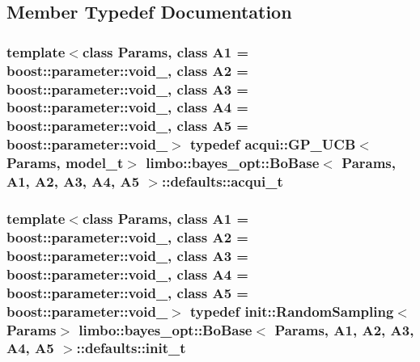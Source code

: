 \subsection{Member Typedef Documentation}
\hypertarget{structlimbo_1_1bayes__opt_1_1_bo_base_1_1defaults_a4ba658f2746db27c5f3abdb24d2a2f85}{}
\subsubsection[{acqui\+\_\+t}]{\setlength{\rightskip}{0pt plus 5cm}template$<$class Params, class A1 = boost\+::parameter\+::void\+\_\+, class A2 = boost\+::parameter\+::void\+\_\+, class A3 = boost\+::parameter\+::void\+\_\+, class A4 = boost\+::parameter\+::void\+\_\+, class A5 = boost\+::parameter\+::void\+\_\+$>$ typedef {\bf acqui\+::\+G\+P\+\_\+\+U\+C\+B}$<$Params, {\bf model\+\_\+t}$>$ {\bf limbo\+::bayes\+\_\+opt\+::\+Bo\+Base}$<$ Params, A1, A2, A3, A4, A5 $>$\+::{\bf defaults\+::acqui\+\_\+t}}\label{structlimbo_1_1bayes__opt_1_1_bo_base_1_1defaults_a4ba658f2746db27c5f3abdb24d2a2f85}
\hypertarget{structlimbo_1_1bayes__opt_1_1_bo_base_1_1defaults_acbba74470eccef31c3f2518a3c57200c}{}
\subsubsection[{init\+\_\+t}]{\setlength{\rightskip}{0pt plus 5cm}template$<$class Params, class A1 = boost\+::parameter\+::void\+\_\+, class A2 = boost\+::parameter\+::void\+\_\+, class A3 = boost\+::parameter\+::void\+\_\+, class A4 = boost\+::parameter\+::void\+\_\+, class A5 = boost\+::parameter\+::void\+\_\+$>$ typedef {\bf init\+::\+Random\+Sampling}$<$Params$>$ {\bf limbo\+::bayes\+\_\+opt\+::\+Bo\+Base}$<$ Params, A1, A2, A3, A4, A5 $>$\+::{\bf defaults\+::init\+\_\+t}}\label{structlimbo_1_1bayes__opt_1_1_bo_base_1_1defaults_acbba74470eccef31c3f2518a3c57200c}
\hypertarget{structlimbo_1_1bayes__opt_1_1_bo_base_1_1defaults_aec54234d95d97261acf5aacca83eecaa}{}
